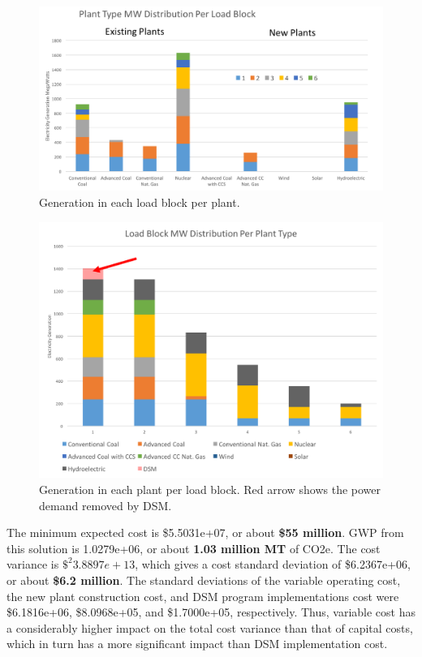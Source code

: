\documentclass{article}
\begin{document}
	\begin{figure}
		\includegraphics[width=\textwidth]{428_1_Mincostplantdis}
		\caption{Generation in each load block per plant.}
	\end{figure}
	
	\begin{figure}
		\includegraphics[scale=0.5]{428_2_Mincostloaddist}
		\centering
		\caption{Generation in each plant per load block. Red arrow shows the power demand removed by DSM.}
	\end{figure}
	
	The minimum expected cost is \$5.5031e+07, or about \textbf{\$55 million}. GWP from this solution is 1.0279e+06, or about \textbf{1.03 million MT} of CO2e. The cost variance is $\$^2 3.8897e+13$, which gives a cost standard deviation of \$6.2367e+06, or about \textbf{\$6.2 million}. The standard deviations of the variable operating cost, the new plant construction cost, and DSM program implementations cost were \$6.1816e+06, \$8.0968e+05, and \$1.7000e+05, respectively. Thus, variable cost has a considerably higher impact on the total cost variance than that of capital costs, which in turn has a more significant impact than DSM implementation cost. 
\end{document}
